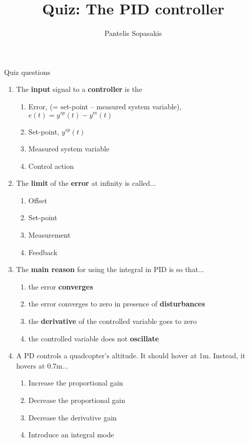 \documentclass[a4paper,10pt,reqno]{amsart}
\title[PID Controller]{Quiz: The PID controller}
\author[P. Sopasakis]{Pantelis Sopasakis}
\numberwithin{equation}{section}
\theoremstyle{plain}
\begin{document}
\maketitle
\pagestyle{empty}
Quiz questions\\
\textbf{}
\begin{enumerate} 
 
 \item The \textbf{input} signal to a \textbf{controller} is the
    \begin{enumerate}
     \item Error, (= set-point -- measured system variable), $e(t) = y^{sp}(t) - y^{m}(t)$
     \item Set-point, $y^{sp}(t)$
     \item Measured system variable
     \item Control action
    \end{enumerate}

 \item The \textbf{limit} of the \textbf{error} at infinity is called...
    \begin{enumerate}
     \item Offset
     \item Set-point
     \item Measurement
     \item Feedback
    \end{enumerate}
    
 \item The \textbf{main reason} for using the integral in PID is so that...
  \begin{enumerate}
   \item the error \textbf{converges}
   \item the error converges to zero in presence of \textbf{disturbances}
   \item the \textbf{derivative} of the controlled variable goes to zero
   \item the controlled variable does not \textbf{oscillate}
  \end{enumerate}    
  
  
  \item A PD controls a quadcopter's altitude. It should hover at 1m. Instead, it hovers at 0.7m...     
  \begin{enumerate}
   \item Increase the proportional gain
   \item Decrease the proportional gain
   \item Decrease the derivative gain
   \item Introduce an integral mode
  \end{enumerate}
  



\end{enumerate}
\end{document}
